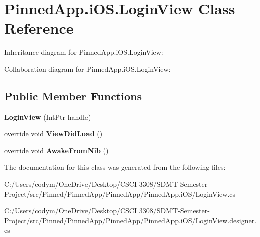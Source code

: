 \hypertarget{class_pinned_app_1_1i_o_s_1_1_login_view}{}\section{Pinned\+App.\+i\+O\+S.\+Login\+View Class Reference}
\label{class_pinned_app_1_1i_o_s_1_1_login_view}


Inheritance diagram for Pinned\+App.\+i\+O\+S.\+Login\+View\+:


Collaboration diagram for Pinned\+App.\+i\+O\+S.\+Login\+View\+:
\subsection*{Public Member Functions}
\begin{DoxyCompactItemize}
\item 
\mbox{\label{class_pinned_app_1_1i_o_s_1_1_login_view_ae953386224add26f2c723da4596ab23e}} 
{\bfseries Login\+View} (Int\+Ptr handle)
\item 
\mbox{\label{class_pinned_app_1_1i_o_s_1_1_login_view_a25f3376b94c8dea5b179ba745fe07961}} 
override void {\bfseries View\+Did\+Load} ()
\item 
\mbox{\label{class_pinned_app_1_1i_o_s_1_1_login_view_a11ee3c46a315a46654e3e4fcfb1e1b79}} 
override void {\bfseries Awake\+From\+Nib} ()
\end{DoxyCompactItemize}


The documentation for this class was generated from the following files\+:\begin{DoxyCompactItemize}
\item 
C\+:/\+Users/codym/\+One\+Drive/\+Desktop/\+C\+S\+C\+I 3308/\+S\+D\+M\+T-\/\+Semester-\/\+Project/src/\+Pinned/\+Pinned\+App/\+Pinned\+App/\+Pinned\+App.\+i\+O\+S/Login\+View.\+cs\item 
C\+:/\+Users/codym/\+One\+Drive/\+Desktop/\+C\+S\+C\+I 3308/\+S\+D\+M\+T-\/\+Semester-\/\+Project/src/\+Pinned/\+Pinned\+App/\+Pinned\+App/\+Pinned\+App.\+i\+O\+S/Login\+View.\+designer.\+cs\end{DoxyCompactItemize}
